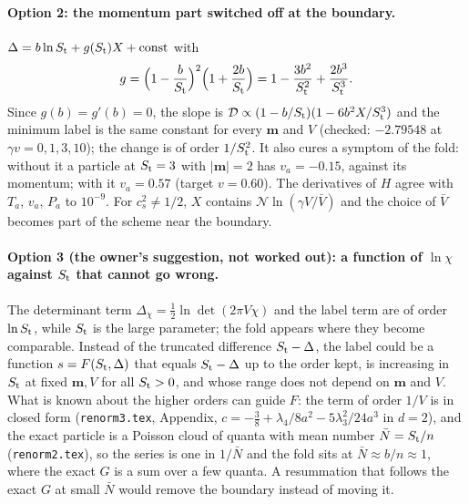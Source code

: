 \documentclass[11pt,aps,preprint,nofootinbib,superscriptaddress,tightenlines]{revtex4-2}
\def\st{\begin{equation}}
\def\stp{\end{equation}}
\let\oldparagraph\paragraph
\renewcommand{\paragraph}{\par\bigskip\oldparagraph}
\begin{document}
\paragraph{Option 2: the momentum part switched off at the boundary.}  $\Delta=b\ln S_{\rm t}+g(S_{\rm t})X+\text{const}$ with
\st
g=\Big(1-\frac b{S_{\rm t}}\Big)^2\Big(1+\frac{2b}{S_{\rm t}}\Big)=1-\frac{3b^2}{S_{\rm t}^2}+\frac{2b^3}{S_{\rm t}^3} .
\stp
Since $g(b)=g'(b)=0$, the slope is $\mathcal D\propto(1-b/S_{\rm t})(1-6b^2X/S_{\rm t}^3)$ and the minimum label is the same constant for every $\bm m$
and $V$ (checked: $-2.79548$ at $\gamma v=0,1,3,10$); the change is of order $1/S_{\rm t}^2$.  It also cures a symptom of the fold: without it a
particle at $S_{\rm t}=3$ with $|\bm m|=2$ has $v_a=-0.15$, against its momentum; with it $v_a=0.57$ (target $v=0.60$).  The derivatives of $H$ agree
with $T_a$, $v_a$, $P_a$ to $10^{-9}$.  For $c_s^2\ne1/2$, $X$ contains $\mathcal N\ln(\gamma V/\bar V)$ and the choice of $\bar V$ becomes part of
the scheme near the boundary.

\paragraph{Option 3 (the owner's suggestion, not worked out): a function of $\ln\chi$ against $S_{\rm t}$ that cannot go wrong.}  The determinant term
$\Delta_\chi=\tfrac12\ln\det(2\pi V\chi)$ and the label term are of order $\ln S_{\rm t}$, while $S_{\rm t}$ is the large parameter; the fold appears
where they become comparable.  Instead of the truncated difference $S_{\rm t}-\Delta$, the label could be a function $s=F(S_{\rm t},\Delta)$ that equals
$S_{\rm t}-\Delta$ up to the order kept, is increasing in $S_{\rm t}$ at fixed $\bm m,V$ for all $S_{\rm t}>0$, and whose range does not depend on $\bm m$
and $V$.  What is known about the higher orders can guide $F$: the term of order $1/V$ is in closed form (\nolinkurl{renorm3.tex}, Appendix,
$c=-\tfrac38+\lambda_4/8a^2-5\lambda_3^2/24a^3$ in $d=2$), and the exact particle is a Poisson cloud of quanta with mean number $\bar N=S_{\rm t}/n$
(\nolinkurl{renorm2.tex}), so the series is one in $1/\bar N$ and the fold sits at $\bar N\approx b/n\approx1$, where the exact $G$ is a sum over a few
quanta.  A resummation that follows the exact $G$ at small $\bar N$ would remove the boundary instead of moving it.
\end{document}
